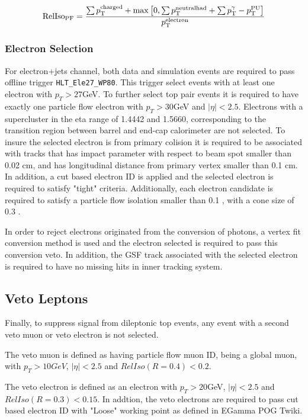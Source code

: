 \begin{equation}
\label{eq: reliso}
\mathrm{RelIso_{PF}} = \frac{\sum p_\mathrm{T}^{\mathrm{charged}}+\max\left[ 0,\sum p_\mathrm{T}^{\mathrm{neutral had}}+\sum p_\mathrm{T}^\gamma-p_\mathrm{T}^{\mathrm{PU}} \right]    }{p_\mathrm{T}^{\mathrm{electron}}} 
\end{equation}


\subsubsection*{Electron Selection}

For electron+jets channel, both data and simulation events are required to pass offline trigger \texttt{HLT\_Ele27\_WP80}. This trigger select events with at least one electron with $p_T>27$GeV.  To further select top pair events it is required to have exactly one particle flow electron with $p_T>30$GeV and $|\eta|<2.5$. Electrons with a supercluster in the eta range of 1.4442 and 1.5660, corresponding to the transition region between barrel and end-cap calorimeter are not selected. To insure the selected electron is from primary colision it is required to be associated with tracks that has impact parameter with respect to beam spot smaller than 0.02 cm, and has longitudinal distance from primary vertex smaller than 0.1 cm. In addition, a cut based electron ID is applied and the selected electron is required to satisfy "tight" criteria\cite{electron_cut_based_ID}. Additionally, each electron candidate is required to satisfy a particle flow isolation smaller than 0.1 , with a cone size of 0.3 . 

In order to reject electrons originated from the conversion of photons, a vertex fit conversion method is used and the electron selected is required to pass this conversion veto. In addition, the GSF track associated with the selected electron is required to have no missing hits in inner tracking system.

\subsection{Veto Leptons}
Finally, to suppress signal from dileptonic top events, any event with a second veto muon or veto electron is not selected.

The veto muon is defined as having particle flow muon ID, being a global muon, with $p_T>10 GeV$, $|\eta|<2.5$ and $RelIso(R=0.4)<0.2$.

The veto electron is defined as an electron with $p_T>20$GeV, $|\eta|<2.5$ and $RelIso(R=0.3)<0.15$. In addtion, the veto electrons are required to pass cut based electron ID with "Loose" working point as defined in EGamma POG Twiki\cite{electron_cut_based_ID}.

